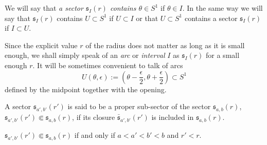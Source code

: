 \begin{defn}
  We will say that \emph{a sector $\mathfrak{s}_{I}(r)$ contains $\theta\in
  S^1$} if $\theta\in I$. In the same way we will say that $\mathfrak{s}_I(r)$
  contains $U\subset S^1$ if $U\subset I$ or that $U\subset S^1$ contains a
  sector $\mathfrak{s}_I(r)$ if $I\subset U$.
\end{defn}
\begin{rem}\label{rem:arcsByWidthAndCenter}
  Since the explicit value $r$ of the radius does not matter as long as it is
  small enough, we shall simply speak of an \emph{arc} or \emph{interval} $I$
  as $\mathfrak{s}_I(r)$ for a small enough $r$.
  It will be sometimes convenient to talk of arcs
  \[
    U(\theta,\epsilon):=\left(\theta-\frac{\epsilon}{2}
    ,\theta+\frac{\epsilon}{2}\right)\subset S^1
  \]
  defined by the midpoint together with the opening.
\end{rem}
\begin{defn}
  A sector $\mathfrak{s}_{a',b'}(r')$ is said to be a proper sub-sector of the
  sector $\mathfrak{s}_{a,b}(r)$,
  $\mathfrak{s}_{a',b'}(r')\Subset\mathfrak{s}_{a,b}(r)$, if its closure
  $\bar{\mathfrak{s}}_{a',b'}(r')$ is included in $\mathfrak{s}_{a,b}(r)$.
  \begin{s-rem}
    $\mathfrak{s}_{a',b'}(r')\Subset\mathfrak{s}_{a,b}(r)$ if and only if
    $a<a'<b'<b$ and $r'<r$.
  \end{s-rem}
\end{defn}

